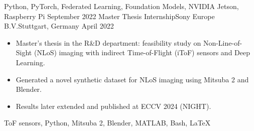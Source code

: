 \begin{experiences}
{\begin{itemize}
        \end{itemize}
    }
    {Python, PyTorch, Federated Learning, Foundation Models, NVIDIA Jetson, Raspberry Pi}
    \emptySeparator
    \experience
    {September 2022} {Master Thesis Internship}{Sony Europe B.V.}{Stuttgart, Germany}
    {April 2022}     {
        \begin{itemize}
            \item Master's thesis in the R\&D department: feasibility study on Non-Line-of-Sight (NLoS) imaging with indirect Time-of-Flight (iToF) sensors and Deep Learning.
            \item Generated a novel synthetic dataset for NLoS imaging using Mitsuba 2 and Blender.
            \item Results later extended and published at ECCV 2024 (NIGHT).
        \end{itemize}
    }
    {ToF sensors, Python, Mitsuba 2, Blender, MATLAB, Bash, \LaTeX}
\end{experiences}
